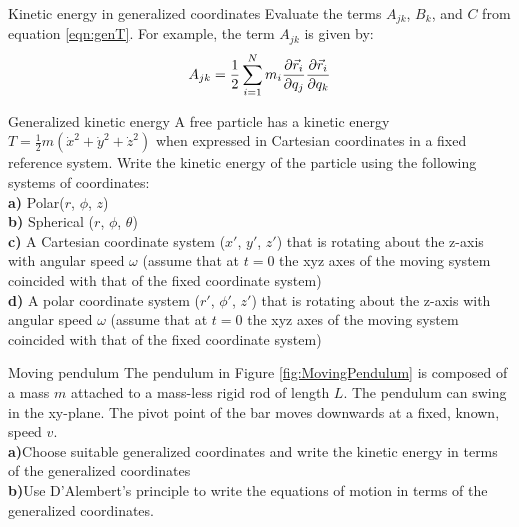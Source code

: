 \begin{problem}{Kinetic energy in generalized coordinates} Evaluate the terms $A_{jk}$, $B_{k}$, and $C$ from equation \ref{eqn:genT}. For example, the term $A_{jk}$ is given by:
\begin{align*}
A_{jk}=\frac{1}{2}\sum_{i=1}^Nm_i\frac{\partial \vec r_i}{\partial q_j}\frac{\partial \vec r_i}{\partial q_k}
\end{align*}
\label{prob_VirtWork_3}
\end{problem}

\begin{problem} {Generalized kinetic energy} A free particle has a kinetic energy $T=\frac{1}{2}m(\dot x^2+\dot y^2+\dot z^2)$ when expressed in Cartesian coordinates in a fixed reference system. Write the kinetic energy of the particle using the following systems of coordinates:\\
\textbf{a)} Polar($r$, $\phi$, $z$)\\
\textbf{b)} Spherical ($r$, $\phi$, $\theta$)\\
\textbf{c)} A Cartesian coordinate system ($x'$, $y'$, $z'$) that is rotating about the z-axis with angular speed $\omega$ (assume that at $t=0$ the xyz axes of the moving system coincided with that of the fixed coordinate system)\\
\textbf{d)} A polar coordinate system ($r'$, $\phi'$, $z'$) that is rotating about the z-axis with angular speed $\omega$ (assume that at $t=0$ the xyz axes of the moving system coincided with that of the fixed coordinate system)
\label{prob_VirtWork_4}
\end{problem}


\begin{problem}{Moving pendulum}
The pendulum in Figure \ref{fig:MovingPendulum} is composed of a mass $m$ attached to a mass-less rigid rod of length $L$. The pendulum can swing in the xy-plane. The pivot point of the bar moves downwards at a fixed, known, speed $v$.
\\
\textbf{a)}Choose suitable generalized coordinates and write the kinetic energy in terms of the generalized coordinates\\
\textbf{b)}Use D'Alembert's principle to write the equations of motion in terms of the generalized coordinates.
\label{prob_VirtWork_5}
\end{problem}

